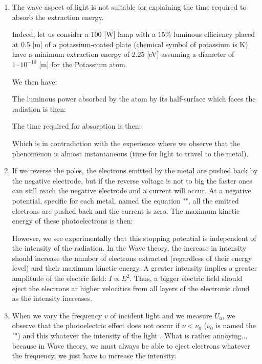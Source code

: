	\begin{enumerate}
		\item The wave aspect of light is not suitable for explaining the time required to absorb the extraction energy.

		Indeed, let us consider a $100$ [W] lamp with a $15\%$ luminous efficiency placed at $0.5$ [m] of a potassium-coated plate (chemical symbol of potassium is $\mathrm{K}$) have a minimum extraction energy of $2.25$ [eV] assuming a diameter of $1\cdot 10^{-10}$ [m] for the Potassium atom.
		
		We then have:
		
		The luminous power absorbed by the atom by its half-surface which faces the radiation is then:
		
		The time required for absorption is then:
		
		Which is in contradiction with the experience where we observe that the phenomenon is almost instantaneous (time for light to travel to the metal).
		
		\item If we reverse the poles, the electrons emitted by the metal are pushed back by the negative electrode, but if the reverse voltage is not to big the faster ones can still reach the negative electrode and a current will occur. At a negative potential, specific for each metal, named the equation "", all the emitted electrons are pushed back and the current is zero. The maximum kinetic energy of these photoelectrons is then:
		
		However, we see experimentally that this stopping potential is independent of the intensity of the radiation. In the Wave theory, the increase in intensity should increase the number of electrons extracted (regardless of their energy level) and their maximum kinetic energy. A greater intensity implies a greater amplitude of the electric field: $I \propto E^2$. Thus, a bigger electric field should eject the electrons at higher velocities from all layers of the electronic cloud as the intensity increases.
		
		\item When we vary the frequency $v$ of incident light and we measure $U_a$, we observe that the photoelectric effect does not occur if $\nu<\nu_0$ ($\nu_0$ is named the "") and this whatever the intensity of the light . What is rather annoying... because in Wave theory, we must always be able to eject electrons whatever the frequency, we just have to increase the intensity.
	\end{enumerate}
